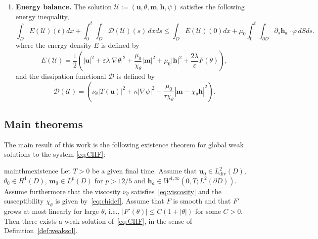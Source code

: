 \documentclass[10pt,letterpaper,twoside]{amsart}
\theoremstyle{definition}{\newtheorem{definition}[lemma]{Definition}}
\theoremstyle{note}{\newtheorem{claim}{Claim}[section]
\newtheorem*{claim*}{Claim}}
\numberwithin{equation}{section}
\newcommand{\dom}{D}
\newcommand{\sol}{\mathcal{U}}
\newcommand{\Grad}{\nabla}
\newcommand{\Div}{\operatorname{div}}
\newcommand{\hdiv}{L^2_{\Div}(\dom)}
\newcommand{\bu}{\mathbf{u}}
\newcommand{\bm}{\mathbf{m}}
\newcommand{\bh}{\mathbf{h}}
\newcommand{\lint}{\int_0^T\!\!\!\int_{\dom}\!}
\begin{document}
\begin{definition}
\begin{enumerate}[label=(\roman*)]
\begin{align}
			&\lint \left[\bm\cdot\partial_t v_3+(\bu\cdot\Grad) v_3\cdot\bm \right]dx dt + \int_{\dom} \bm_0\cdot v_3(0,x) dx=\lint\left[\frac{1}{\tau}(\bm-\kappa_\theta\bh)\cdot v_3\right] dx dt\label{eq:mweak}\\
			&\lint \left[ \theta\cdot \partial_t v_4 + (\bu\cdot \Grad)v_4\cdot \theta\right] dx dt +\int_{\dom}\theta_0 v_4(0,x)dx = \kappa \lint  \Grad\psi\cdot \Grad v_4  dx dt\\
			&\lint \psi v_5 dx dt = \lint \left[\varepsilon \lambda\Grad\theta\cdot \Grad v_5 + \frac{\lambda}{\varepsilon} F'(\theta)v_5- \frac{\mu_0}{2\chi_\theta^2}\chi_\theta' |\bm|^2 v_5\right] dx dt.
		\end{align}
		where $\bu_0\in\hdiv$, $\bm_0\in L^2(\dom)$ and $\theta_0\in H^1(\dom)$ are the initial conditions;
		
		\item {\textbf{Energy balance.}} The solution $\sol:=(\bu,\theta,\bm,\bh,\psi)$ satisfies the following energy inequality,
		\begin{equation}\label{eq:energy0}
			\int_{\dom} E(\sol)(t) dx +\int_0^t\int_{\dom} \mathcal{D}(\sol)(s)\,dx ds\leq \int_{\dom} E(\sol)(0) dx +\mu_0 \int_0^t\int_{\partial\dom}\partial_s\bh_a\cdot\varphi \,dSds.
		\end{equation} 
		where the energy density $E$ is defined by
		\begin{equation}\label{eq:defE}
			E(\sol) = \frac{1}{2}\left(|\bu|^2 +\varepsilon\lambda|\Grad\theta|^2+ \frac{\mu_0}{\chi_\theta}|\bm|^2+\mu_0|\bh|^2+\frac{2\lambda}{\varepsilon}F(\theta)\right),
		\end{equation}
		and the dissipation functional $\mathcal{D}$ is defined by
		\begin{equation}\label{eq:defD}
			\mathcal{D}(\sol) = \left(\nu_\theta |T(\bu)|^2 +\kappa|\Grad\psi|^2+\frac{\mu_0}{\tau \chi_\theta}|\bm-\chi_\theta\bh|^2 \right).
		\end{equation}
	\end{enumerate}
\end{definition}



\subsection{Main theorems}
The main result of this work is the following existence theorem for global weak solutions to the system \eqref{eq:CHF}: 
\begin{restatable}{mainthm}{existence}\label{thm:existence}
	Let $T>0$ be a given final time. Assume that $\bu_0\in \hdiv$, $\theta_0\in H^1(\dom)$, $\bm_0\in L^p(\dom)$ for $p>12/5$ and $\bh_a\in W^{1,\infty}(0,T;L^2(\partial\dom))$. Assume furthermore that the viscosity $\nu_\theta$ satisfies~\eqref{eq:viscosity} and the susceptibility $\chi_\theta$ is given by~\eqref{eq:chidef}. Assume that $F$ is smooth and that $F'$ grows at most linearly for large $\theta$, i.e., $|F'(\theta)|\leq C(1+|\theta|)$ for some $C>0$. Then there exists a weak solution of~\eqref{eq:CHF}, in the sense of Definition~\ref{def:weaksol}.
\end{restatable}
\end{document}
